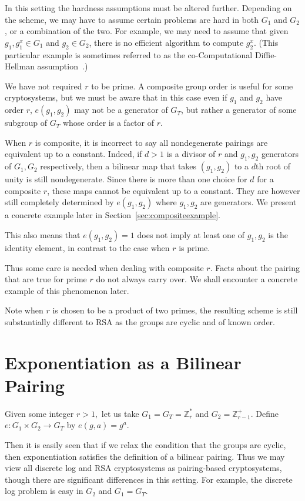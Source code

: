 In this setting the hardness assumptions must be altered further.
Depending on the scheme, we may have to assume certain problems are hard in
both $G_1$ and $G_2$, or a combination of the two. For example, we may
need to assume that given $g_1, g_1^x \in G_1$ and $g_2 \in G_2$,
there is no efficient algorithm to compute $g_2^x$. (This particular
example is sometimes referred to as
the co-Computational Diffie-Hellman assumption~\cite{bls}.)

We have not required $r$ to be prime. A composite group
order is useful for some cryptosystems\cite{bgn},
but we must be aware that in this case even if $g_1$ and $g_2$ have order
$r$, $e(g_1, g_2)$ may not be a generator of $G_T$, but rather a generator
of some subgroup of $G_T$ whose order is a factor of $r$.

When $r$ is composite, it is incorrect to say all nondegenerate pairings are
equivalent up to a constant. Indeed, if $d > 1$ is a divisor of $r$
and $g_1, g_2$ generators of $G_1, G_2$ respectively, then a bilinear map
that takes $(g_1, g_2)$ to a $d$th root of unity is still nondegenerate.
Since there is more than one choice for $d$ for a composite $r$,
these maps cannot be equivalent up to a constant. They are however still
completely determined by $e(g_1, g_2)$ where $g_1, g_2$ are generators.
We present a concrete example later in Section~\ref{sec:compositeexample}.

This also means that $e(g_1, g_2) = 1$ does not imply at least
one of $g_1, g_2$ is the identity element, in contrast to the case when
$r$ is prime.

Thus some care is needed when dealing with composite $r$.
Facts about the pairing that are true for prime $r$ do not always carry over.
We shall encounter a concrete example of this phenomenon later.

Note when $r$ is chosen to be a product of two primes, the resulting scheme
is still substantially different to RSA as the groups are cyclic and of
known order.

\section{Exponentiation as a Bilinear Pairing}

Given some integer $r > 1,$
let us take $G_1 = G_T = \mathbb{Z}_r^*$ and $G_2 = \mathbb{Z}_{r-1}^+$.
Define $e:G_1\times G_2 \rightarrow G_T$ by $e(g, a)= g^a$.

Then it is easily seen that if we relax the condition that the groups
are cyclic, then exponentiation satisfies the definition of a bilinear pairing.
Thus we may view all discrete log and RSA cryptosystems
as pairing-based cryptosystems, though there are significant differences
in this setting. For example, the discrete log problem is easy
in $G_2$ and $G_1 = G_T$.

